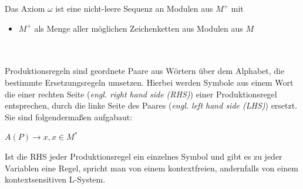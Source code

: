 \documentclass[11pt]{article}
\begin{document}
    Das Axiom $\omega$ ist eine nicht-leere Sequenz an Modulen aus $M^+$ mit
    \begin{itemize}
        \item $M^+$ als Menge aller möglichen Zeichenketten aus Modulen aus $M$
    \end{itemize}
    \\~\\
    Produktionsregeln sind geordnete Paare aus Wörtern über dem Alphabet, die bestimmte Ersetzungsregeln umsetzen. 
    Hierbei werden Symbole aus einem Wort die einer rechten Seite (\textit{engl. right hand side (RHS)}) einer
    Produktionsregel entsprechen, durch die linke Seite des Paares (\textit{engl. left hand side (LHS)}) ersetzt.
    Sie sind folgendermaßen aufgabaut:
    \begin{center}
        $A(P)\rightarrow x,x\in M^*$
    \end{center}
    Ist die RHS jeder Produktionsregel ein einzelnes Symbol und gibt es zu jeder Variablen eine Regel, spricht man
    von einem kontextfreien, andernfalls von einem kontextsensitiven L-System.
    
\end{document}
